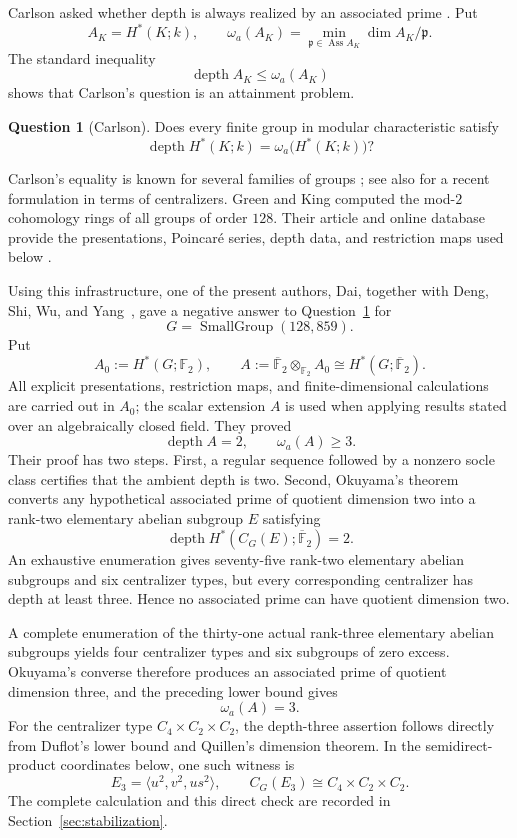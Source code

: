 \documentclass[11pt]{amsart}
\theoremstyle{definition}
\newtheorem{question}[theorem]{Question}
\theoremstyle{remark}
\DeclareMathOperator{\depth}{depth}
\DeclareMathOperator{\Ass}{Ass}
\newcommand{\F}{\mathbb F}
\newcommand{\kbar}{\overline{\mathbb F}_{2}}
\newcommand{\SG}[2]{\operatorname{SmallGroup}(#1,#2)}
\begin{document}
Carlson asked whether depth is always realized by an associated prime \cite[Question~3.1]{Carlson1995}.  Put
\[
A_K=H^*(K;k),
\qquad
\omega_a(A_K)=\min_{\mathfrak p\in\Ass A_K}\dim A_K/\mathfrak p.
\]
The standard inequality
\[
\depth A_K\leq\omega_a(A_K)
\]
shows that Carlson's question is an attainment problem.

\begin{question}[Carlson]
\label{q:carlson}
Does every finite group in modular characteristic satisfy
\[
\depth H^*(K;k)=\omega_a\bigl(H^*(K;k)\bigr)?
\]
\end{question}

Carlson's equality is known for several families of groups \cite{Green2003,Schafer2019,Garaialde2022}; see also \cite{Schafer2025} for a recent formulation in terms of centralizers.  Green and King computed the mod-$2$ cohomology rings of all groups of order $128$.  Their article and online database provide the presentations, Poincar\'e series, depth data, and restriction maps used below \cite{GreenKing2011,GreenKingDatabase}.

Using this infrastructure, one of the present authors, Dai, together with Deng, Shi, Wu, and Yang~\cite{DaiEtAl2026}, gave a negative answer to Question~\ref{q:carlson} for
\[
G=\SG{128}{859}.
\]
Put
\[
A_0:=H^*(G;\F_2),
\qquad
A:=\kbar\otimes_{\F_2}A_0
   \cong H^*(G;\kbar).
\]
All explicit presentations, restriction maps, and finite-dimensional calculations are carried out in $A_0$; the scalar extension $A$ is used when applying results stated over an algebraically closed field.  They proved
\[
\depth A=2,
\qquad
\omega_a(A)\geq3.
\]
Their proof has two steps.  First, a regular sequence followed by a nonzero socle class certifies that the ambient depth is two.  Second, Okuyama's theorem converts any hypothetical associated prime of quotient dimension two into a rank-two elementary abelian subgroup $E$ satisfying
\[
\depth H^*(C_G(E);\kbar)=2.
\]
An exhaustive enumeration gives seventy-five rank-two elementary abelian subgroups and six centralizer types, but every corresponding centralizer has depth at least three.  Hence no associated prime can have quotient dimension two.

A complete enumeration of the thirty-one actual rank-three elementary abelian subgroups yields four centralizer types and six subgroups of zero excess.  Okuyama's converse therefore produces an associated prime of quotient dimension three, and the preceding lower bound gives
\[
\omega_a(A)=3.
\]
For the centralizer type $C_4\times C_2\times C_2$, the depth-three assertion follows directly from Duflot's lower bound and Quillen's dimension theorem.  In the semidirect-product coordinates below, one such witness is
\[
E_3=\langle u^2,v^2,us^2\rangle,
\qquad
C_G(E_3)\cong C_4\times C_2\times C_2.
\]
The complete calculation and this direct check are recorded in Section~\ref{sec:stabilization}.
\end{document}
